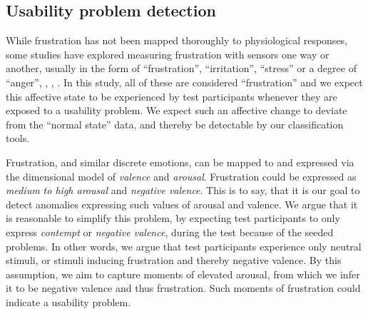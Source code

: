 \subsection{Usability problem detection}
While frustration has not been mapped thoroughly to physiological responses, some studies have explored measuring
frustration with sensors one way or another, usually in the form of ``frustration'', ``irritation'', ``stress'' or a
degree of ``anger''\cite{affective_pacman}, \cite{brainwave_signals_frustration}, \cite{web20_frustration}, \cite{bipolar_frustration}.
In this study, all of these are considered ``frustration'' and we expect this affective state to be
experienced by test participants whenever they are exposed to a usability problem. We expect such an affective change
to deviate from the ``normal state'' data, and thereby be detectable by our classification tools.

Frustration, and similar discrete emotions, can be mapped to and expressed via the dimensional model of \textit{valence}
and \textit{arousal}. Frustration could be expressed as \textit{medium to high arousal} and \textit{negative
  valence}. This is to say, that it is our goal to detect anomalies expressing such values of arousal and
valence. We argue that it is reasonable to simplify this problem, by expecting test participants to only
express \textit{contempt} or \textit{negative valence}, during the test because of the seeded problems. In other words, we argue that test participants experience only neutral stimuli, or stimuli inducing frustration and thereby negative valence. By this assumption, we
aim to capture moments of elevated arousal, from which we infer it to be negative valence and thus frustration.
Such moments of frustration could indicate a usability problem.

